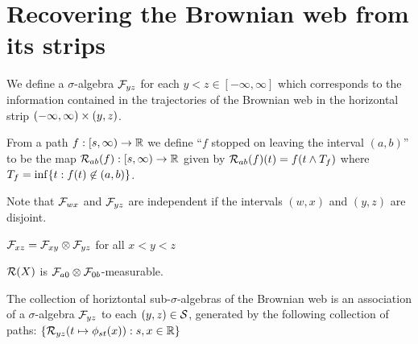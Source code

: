 {
\section{Recovering the Brownian web from its strips}


We define a $\sigma$-algebra $\mathcal{F}_{y z}$ for each $y < z \in
[-\infty, \infty]$ which corresponds to the information contained in
the trajectories of the Brownian web in the horizontal strip
$(-\infty, \infty) \times (y,z)$.

\begin{definition}
  \newcommand{\T}{\stripleavetime{f}}
  \label{def:restrict}
  From a path $f : [s, \infty) \to \mathbb{R}$ we define ``$f$ stopped on
    leaving the interval $(a,b)$'' to be the map $\mathcal{R}_{{a}{b}}(f) : [s,
      \infty) \to \mathbb{R}$ given by $\restrict{a}{b}{f}(t) = f(t \minsym \T)$
      where $\T = \inf\{ t : f(t) \not\in (a,b) \}$.
\end{definition}


\begin{observation}
  Note that $\mathcal{F}_{w x}$ and $\mathcal{F}_{y z}$ are independent if the
  intervals $(w,x)$ and $(y,z)$ are disjoint.
\end{observation}

\renewcommand{\top}{b}
\newcommand{\bottom}{a}

\begin{theorem}
  $\mathcal{F}_{x z} = \mathcal{F}_{x y} \otimes \mathcal{F}_{y z}$ for all $x < y < z$
\end{theorem}

\begin{lemma}
  $\mathcal{R}(X)$ is $\factor{\bottom}{0} \tensor
  \factor{0}{\top}$-measurable.
\end{lemma}

\newcommand{\brownianwebnoise}{collection of horiztontal
  sub-$\sigma$-algebras of the Brownian web}

\begin{definition}
  The \brownianwebnoise{} is an
  association of a $\sigma$-algebra $\mathcal{F}_{y z}$ to each $(y, z)
  \in \mathcal{S}$, generated by the following collection of paths:
  $\{ \mathcal{R}_{{y}{z}}(t \mapsto \phi_{{s}{t}}(x)) : s, x \in \mathbb{R} \}$
\end{definition}

}
